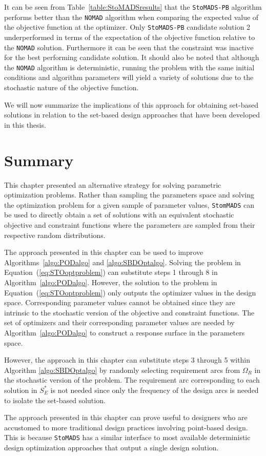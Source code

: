 It can be seen from Table~\ref{table:StoMADSresults} that the \texttt{StoMADS-PB} algorithm performs better than the \texttt{NOMAD} algorithm when comparing the expected value of the objective function at the optimizer. Only \texttt{StoMADS-PB} candidate solution 2 underperformed in terms of the expectation of the objective function relative to the \texttt{NOMAD} solution. Furthermore it can be seen that the constraint was inactive for the best performing candidate solution. It should also be noted that although the \texttt{NOMAD} algorithm is deterministic, running the problem with the same initial conditions and algorithm parameters will yield a variety of solutions due to the stochastic nature of the objective function.

We will now summarize the implications of this approach for obtaining set-based solutions in relation to the set-based design approaches that have been developed in this thesis.

\section{Summary}
\label{sec:stohasticoptsummary}

This chapter presented an alternative strategy for solving parametric optimization problems. Rather than sampling the parameters space and solving the optimization problem for a given sample of parameter values, \texttt{StomMADS} can be used to directly obtain a set of solutions with an equivalent stochastic objective and constraint functions where the parameters are sampled from their respective random distributions.

The approach presented in this chapter can be used to improve Algorithms~\ref{algo:PODalgo} and \ref{algo:SBDOptalgo}. Solving the problem in Equation~(\ref{eq:STOoptproblem}) can substitute steps 1 through 8 in Algorithm~\ref{algo:PODalgo}. However, the solution to the problem in Equation~(\ref{eq:STOoptproblem}) only outputs the optimizer values in the design space. Corresponding parameter values cannot be obtained since they are intrinsic to the stochastic version of the objective and constraint functions. The set of optimizers and their corresponding parameter values are needed by Algorithm~\ref{algo:PODalgo} to construct a response surface in the parameters space.

However, the approach in this chapter can substitute steps 3 through 5 within Algorithm \ref{algo:SBDOptalgo} by randomly selecting requirement arcs from $\Omega_R$ in the stochastic version of the problem. The requirement arc corresponding to each solution in $S_{E}^*$ is not needed since only the frequency of the design arcs is needed to isolate the set-based solution.

The approach presented in this chapter can prove useful to designers who are accustomed to more traditional design practices involving point-based design. This is because \texttt{StoMADS} has a similar interface to most available deterministic design optimization approaches that output a single design solution.